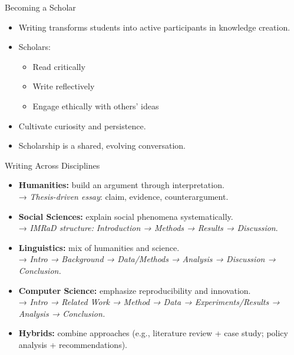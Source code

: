 \documentclass[aspectratio=169]{beamer}
\begin{document}
\begin{frame}{Becoming a Scholar}
\begin{itemize}
  \item Writing transforms students into active participants in knowledge creation.
  \item Scholars:
    \begin{itemize}
      \item Read critically
      \item Write reflectively
      \item Engage ethically with others’ ideas
    \end{itemize}
  \item Cultivate curiosity and persistence.
  \item Scholarship is a shared, evolving conversation.
\end{itemize}
\end{frame}

\begin{frame}{Writing Across Disciplines}
\begin{itemize}
  \item \textbf{Humanities:} build an argument through interpretation.  
    \\ → \textit{Thesis-driven essay}: claim, evidence, counterargument.
  \item \textbf{Social Sciences:} explain social phenomena systematically.  
    \\ → \textit{IMRaD structure:} \textit{Introduction →  Methods →  Results →  Discussion}.
  \item \textbf{Linguistics:} mix of humanities and science.  
    \\ → \textit{Intro → Background → Data/Methods → Analysis → Discussion → Conclusion.}
  \item \textbf{Computer Science:} emphasize reproducibility and innovation.  
    \\ → \textit{Intro → Related Work → Method → Data → Experiments/Results → Analysis → Conclusion.}
  \item \textbf{Hybrids:} combine approaches (e.g., literature review + case study; policy analysis + recommendations).
\end{itemize}
\end{frame}
\end{document}
